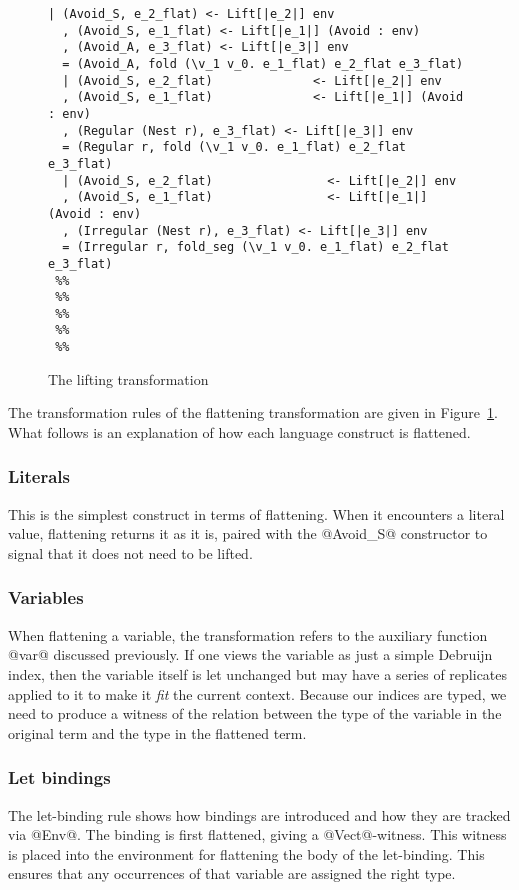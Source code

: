 \begin{figure}
\begin{lstlisting}[multicols=2,style=ndp]
  | (Avoid_S, e_2_flat) <- Lift[|e_2|] env
  , (Avoid_S, e_1_flat) <- Lift[|e_1|] (Avoid : env)
  , (Avoid_A, e_3_flat) <- Lift[|e_3|] env
  = (Avoid_A, fold (\v_1 v_0. e_1_flat) e_2_flat e_3_flat)
  | (Avoid_S, e_2_flat)              <- Lift[|e_2|] env
  , (Avoid_S, e_1_flat)              <- Lift[|e_1|] (Avoid : env)
  , (Regular (Nest r), e_3_flat) <- Lift[|e_3|] env
  = (Regular r, fold (\v_1 v_0. e_1_flat) e_2_flat e_3_flat)
  | (Avoid_S, e_2_flat)                <- Lift[|e_2|] env
  , (Avoid_S, e_1_flat)                <- Lift[|e_1|] (Avoid : env)
  , (Irregular (Nest r), e_3_flat) <- Lift[|e_3|] env
  = (Irregular r, fold_seg (\v_1 v_0. e_1_flat) e_2_flat e_3_flat)
 %%
 %%
 %%
 %%
 %%
\end{lstlisting}
\caption{The lifting transformation}
\label{fig:lifting-transform}
\end{figure}

The transformation rules of the flattening transformation are given in Figure~\ref{fig:lifting-transform}. What follows is an explanation of how each language construct is flattened.

\subsubsection{Literals}
This is the simplest construct in terms of flattening. When it encounters a literal value, flattening returns it as it is, paired with the @Avoid_S@ constructor to signal that it does not need to be lifted.

\subsubsection{Variables }
When flattening a variable, the transformation refers to the auxiliary function @var@ discussed previously. If one views the variable as just a simple Debruijn index, then the variable itself is let unchanged but may have a series of replicates applied to it to make it \emph{fit} the current context. Because our indices are typed, we need to produce a witness of the relation between the type of the variable in the original term and the type in the flattened term.

\subsubsection{Let bindings}
The let-binding rule shows how bindings are introduced and how they are tracked via @Env@. The binding is first flattened, giving a @Vect@-witness. This witness is placed into the environment for flattening the body of the let-binding. This ensures that any occurrences of that variable are assigned the right type.

